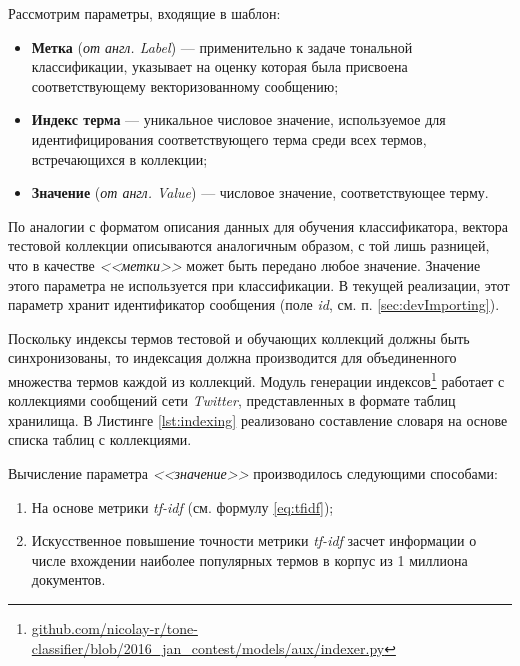     Рассмотрим параметры, входящие в шаблон:
    \begin{itemize}
        \item {\bf Метка} ({\it от англ. Label}) --- применительно к задаче
        тональной классификации, указывает на оценку которая была присвоена
        соответствующему векторизованному сообщению;
        \item {\bf Индекс терма} --- уникальное числовое значение, используемое
        для идентифицирования соответствующего терма среди всех термов, встречающихся
        в коллекции;
        \item {\bf Значение} ({\it от англ. Value}) --- числовое значение,
        соответствующее терму.
    \end{itemize}

    По аналогии с форматом описания данных для обучения классификатора, вектора
    тестовой коллекции описываются аналогичным образом, с той лишь разницей, что
    в качестве {\it <<метки>>} может быть передано любое значение.
    Значение этого параметра не используется при классификации.
    В текущей реализации, этот параметр хранит идентификатор сообщения (поле
    {\it id}, см. п. \ref{sec:devImporting}).

    Поскольку индексы термов тестовой и обучающих коллекций должны быть
    синхронизованы, то индексация должна производится для объединенного
    множества термов каждой из коллекций.
    Модуль генерации индексов\footnote{
        \url{github.com/nicolay-r/tone-classifier/blob/2016_jan_contest/models/aux/indexer.py}
    }
    работает с коллекциями сообщений сети {\it Twitter},
    представленных в формате таблиц хранилища. В Листинге \ref{lst:indexing}
    реализовано составление словаря на основе списка таблиц с коллекциями.

    \lstset{style=python}
    

    Вычисление параметра {\it <<значение>>} производилось следующими способами:
    \begin{enumerate}
        \item На основе метрики {\it tf-idf} (см. формулу \ref{eq:tfidf});
        \item Искусственное повышение точности метрики {\it tf-idf} засчет информации о числе
            вхождении наиболее популярных термов в корпус из 1 миллиона документов.
    \end{enumerate}

